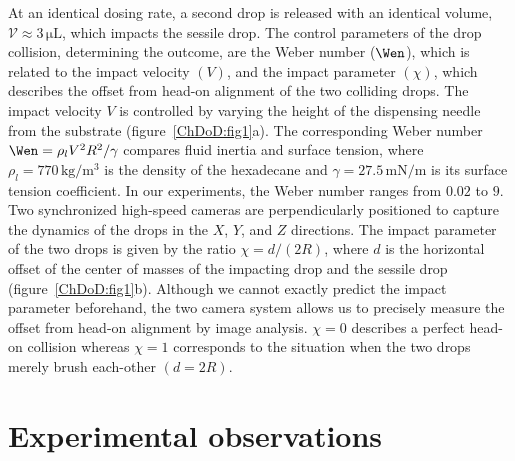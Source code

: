 At an identical dosing rate, a second drop is released with an identical volume, $\mathcal{V} \approx 3\,\si{\micro\liter}$, which impacts the sessile drop. The control parameters of the drop collision, determining the outcome, are the Weber number ($\Wen$), which is related to the impact velocity $\left(V\right)$, and the impact parameter $\left(\chi\right)$, which describes the offset from head-on alignment of the two colliding drops. The impact velocity $V$ is controlled by varying the height of the dispensing needle from the substrate (figure~\ref{ChDoD:fig1}a). The corresponding Weber number $\Wen = \rho_lV^2R^2/\gamma$ compares fluid inertia and surface tension, where $\rho_l = 770\,\si{\kilogram}/\si{\cubic\meter}$ is the density of the hexadecane and $\gamma = 27.5\,\si{\milli\newton}/\si{\meter}$ is its surface tension coefficient. In our experiments, the Weber number ranges from $0.02$ to $9$. Two synchronized high-speed cameras are perpendicularly positioned to capture the dynamics of the drops in the $X$, $Y$, and $Z$ directions. The impact parameter of the two drops is given by the ratio $\chi = d/\left(2R\right)$, where $d$ is the horizontal offset of the center of masses of the impacting drop and the sessile drop (figure~\ref{ChDoD:fig1}b). Although we cannot exactly predict the impact parameter beforehand, the two camera system allows us to precisely measure the offset from head-on alignment by image analysis. $\chi = 0$ describes a perfect head-on collision whereas $\chi=1$ corresponds to the situation when the two drops merely brush each-other $\left(d = 2R\right)$. 

\section{Experimental observations}\label{Ch5:Exp}

